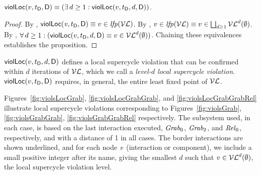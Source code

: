 
\begin{proposition}
\label{prop:locViol-equiv-locViolDist}
$\scVL{v}{t_\DS}{\act}{\l} \ev (\ex d \ge 1: \scVLd{v}{d}{t_\DS}{\act}{\l})$.
\end{proposition}
%
\begin{proof}
By , $\scVL{\ndv}{t_\DS}{\act}{\l} \ev v \in \lfp{\lVFs}$.
By , $v \in \lfp{\lVFs} \ev v \in \JOIN_{d \ge 1} \lVFs^{d} (\ewfg)$.
By , $\fa d \ge 1: (\scVLd{v}{d}{t_\DS}{\act}{\l} \ev v \in \lVFs^{d} (\ewfg))$.
Chaining these equivalences establishes the proposition.
\end{proof}
%
$\scVLd{v}{d}{t_\DS}{\act}{\l}$ defines a local supercycle violation that can be confirmed within $d$ iterations of $\lVFs$, which we call a
\emph{level-$d$ local supercycle violation}.
$\scVL{v}{t_\DS}{\act}{\l}$ requires, in general, the entire least fixed point of $\lVFs$.



\begin{example}
\label{exm:loc-dphils-viols}
Figures~\ref{fig:violsLocGrab}, \ref{fig:violsLocGrabGrab}, and \ref{fig:violsLocGrabGrabRel} illustrate local supercycle violations corresponding to
Figures~\ref{fig:violsGrab}, \ref{fig:violsGrabGrab}, \ref{fig:violsGrabGrabRel} respectively. The subsystem used, in each case, is based on the last interaction
executed, \ie $\Grab_0$, $\Grab_2$, and $\Rel_0$, respectively, and with a distance of 1 in all cases.
The border interactions are shown underlined, and 
for each node $\ndv$ (interaction or component), we include a small positive integer after its name, giving the smallest $d$ such that $v \in \lVFi{\ewfg}{d}$, 
\ie the local supercycle violation level.
\end{example}



